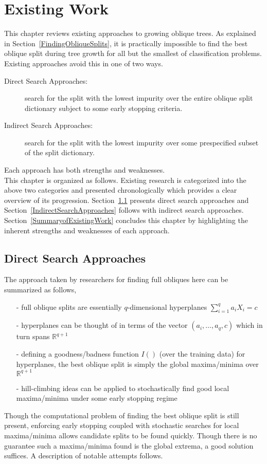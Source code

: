 \chapter{Existing Work}
\label{ExistingWork} 
This chapter reviews existing approaches to growing oblique trees. As explained in Section~\ref{FindingObliqueSplits}, it is practically impossible to find the best oblique split during tree growth for all but the smallest of classification problems. Existing approaches avoid this in one of two ways.
\begin{description}
\item[Direct Search Approaches:] search for the split with the lowest impurity over the entire oblique split dictionary subject to some early stopping criteria.
\item[Indirect Search Approaches:] search for the split with the lowest impurity over some prespecified subset of the split dictionary.
\end{description}
Each approach has both strengths and weaknesses.\\

This chapter is organized as follows. Existing research is categorized into the above two categories and presented chronologically which provides a clear overview of its progression. Section~\ref{DirectSearchApproaches} presents direct search approaches and Section~\ref{IndirectSearchApproaches} follows with indirect search approaches. Section~\ref{SummaryofExistingWork} concludes this chapter by highlighting the inherent strengths and weaknesses of each approach.

\section{Direct Search Approaches}
\label{DirectSearchApproaches}
The approach taken by researchers for finding full obliques here can be summarized as follows, 
\begin{itemize}
\item[-] full oblique splits are essentially $q$-dimensional hyperplanes $\sum_{i=1}^q a_iX_i=c$
\item[-] hyperplanes can be thought of in terms of the vector $\left(a_i,\ldots,a_q,c\right)$ which in turn spans $\mathbb{R}^{q+1}$ 
\item[-] defining a goodness/badness function $I()$ (over the training data) for hyperplanes, the best oblique split is simply the global maxima/minima over $\mathbb{R}^{q+1}$
\item[-] hill-climbing ideas can be applied to stochastically find good local maxima/minima under some early stopping regime
\end{itemize}
Though the computational problem of finding the best oblique split is still present, enforcing early stopping coupled with stochastic searches for local maxima/minima allows candidate splits to be found quickly. Though there is no guarantee such a maxima/minima found is the global extrema, a good solution suffices. A description of notable attempts follows.

